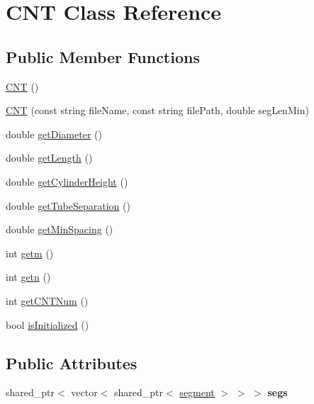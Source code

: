 \hypertarget{class_c_n_t}{}\section{C\+N\+T Class Reference}
\label{class_c_n_t}
\subsection*{Public Member Functions}
\begin{DoxyCompactItemize}
\item 
\hyperlink{class_c_n_t_a738f655cf3607971fb1ee78f0457fe54}{C\+N\+T} ()
\item 
\hyperlink{class_c_n_t_aebba0aaf1db3388185c51aa5ba1147fd}{C\+N\+T} (const string file\+Name, const string file\+Path, double seg\+Len\+Min)
\item 
double \hyperlink{class_c_n_t_a070537729269aa475200066010cd24a0}{get\+Diameter} ()
\item 
double \hyperlink{class_c_n_t_ae5693d14f88d6fa437c1748e2961a73a}{get\+Length} ()
\item 
double \hyperlink{class_c_n_t_a780a8ad296ba7dd8080a1302ae135882}{get\+Cylinder\+Height} ()
\item 
double \hyperlink{class_c_n_t_a219c7a3c530198cd4cffbecca8c10aea}{get\+Tube\+Separation} ()
\item 
double \hyperlink{class_c_n_t_a1d057f2fda6b4b7a89afaa6e50b597bb}{get\+Min\+Spacing} ()
\item 
int \hyperlink{class_c_n_t_ad381bb3de052f16417ab004df7fb1208}{getm} ()
\item 
int \hyperlink{class_c_n_t_a06d71da989e69e3ce4c2b7f5a2ac053b}{getn} ()
\item 
int \hyperlink{class_c_n_t_aa08eeaa7648119cce31a4e21042a2869}{get\+C\+N\+T\+Num} ()
\item 
bool \hyperlink{class_c_n_t_af2535e2a5cb24d3c1a0b31540ce28d62}{is\+Initialized} ()
\end{DoxyCompactItemize}
\subsection*{Public Attributes}
\begin{DoxyCompactItemize}
\item 
\hypertarget{class_c_n_t_a8bfda30cfb05e62b6a246d9dc5c15a44}{}shared\+\_\+ptr$<$ vector$<$ shared\+\_\+ptr$<$ \hyperlink{structsegment}{segment} $>$ $>$ $>$ {\bfseries segs}\label{class_c_n_t_a8bfda30cfb05e62b6a246d9dc5c15a44}

\end{DoxyCompactItemize}


